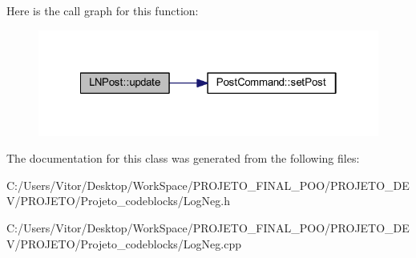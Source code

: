 Here is the call graph for this function\-:\nopagebreak
\begin{figure}[H]
\begin{center}
\leavevmode
\includegraphics[width=322pt]{class_l_n_post_a76e4575cc5e542510c1f135f879e88f5_cgraph}
\end{center}
\end{figure}




The documentation for this class was generated from the following files\-:\begin{DoxyCompactItemize}
\item 
C\-:/\-Users/\-Vitor/\-Desktop/\-Work\-Space/\-P\-R\-O\-J\-E\-T\-O\-\_\-\-F\-I\-N\-A\-L\-\_\-\-P\-O\-O/\-P\-R\-O\-J\-E\-T\-O\-\_\-\-D\-E\-V/\-P\-R\-O\-J\-E\-T\-O/\-Projeto\-\_\-codeblocks/Log\-Neg.\-h\item 
C\-:/\-Users/\-Vitor/\-Desktop/\-Work\-Space/\-P\-R\-O\-J\-E\-T\-O\-\_\-\-F\-I\-N\-A\-L\-\_\-\-P\-O\-O/\-P\-R\-O\-J\-E\-T\-O\-\_\-\-D\-E\-V/\-P\-R\-O\-J\-E\-T\-O/\-Projeto\-\_\-codeblocks/Log\-Neg.\-cpp\end{DoxyCompactItemize}
